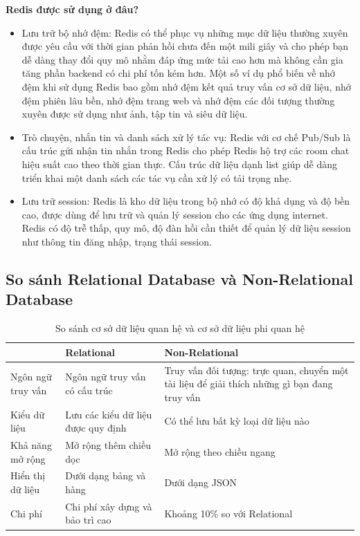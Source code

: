 \textbf{Redis được sử dụng ở đâu?}
\begin{itemize}
    \item Lưu trữ bộ nhớ đệm: Redis có thể phục vụ những mục dữ liệu thường xuyên được yêu cầu với thời gian phản hồi chưa đến một mili giây và cho phép bạn dễ dàng thay đổi quy mô nhằm đáp ứng mức tải cao hơn mà không cần gia tăng phần backend có chi phí tốn kém hơn. Một số ví dụ phổ biến về nhớ đệm khi sử dụng Redis bao gồm nhớ đệm kết quả truy vấn cơ sở dữ liệu, nhớ đệm phiên lâu bền, nhớ đệm trang web và nhớ đệm các đối tượng thường xuyên được sử dụng như ảnh, tập tin và siêu dữ liệu.
    \item Trò chuyện, nhắn tin và danh sách xử lý tác vụ: Redis với cơ chế Pub/Sub là cấu trúc gửi nhận tin nhắn trong Redis cho phép Redis hộ trợ các room chat hiệu suất cao theo thời gian thực. Cấu trúc dữ liệu dạnh list giúp dễ dàng triển khai một danh sách các tác vụ cần xử lý có tải trọng nhẹ.
    \item Lưu trữ session: Redis là kho dữ liệu trong bộ nhớ có độ khả dụng và độ bền cao, được dùng để lưu trữ và quản lý session cho các ứng dụng internet. Redis có độ trễ thấp, quy mô, độ đàn hồi cần thiết để quản lý dữ liệu session như thông tin đăng nhập, trạng thái session.
\end{itemize}
\subsection{So sánh Relational Database và Non-Relational Database}
\begin{table}[H]
	    \centering
	    \begin{tabular}{|p{3cm}|p{6cm}|p{6cm}|}
	        \hline
	        &\textbf{Relational}&\textbf{Non-Relational}\\
	        \hline
	        Ngôn ngữ truy vấn&Ngôn ngữ truy vấn có cấu trúc &Truy vấn đối tượng: trực quan, chuyển một tài liệu để giải thích những gì bạn đang truy vấn\\
	        \hline
	        Kiểu dữ liệu&Lưu các kiểu dữ liệu được quy định&Có thể lưu bất kỳ loại dữ liệu nào\\
	        \hline
	        Khả năng mở rộng&Mở rộng thêm chiều dọc&Mở rộng theo chiều ngang\\
	        \hline
	        Hiển thị dữ liệu&Dưới dạng bảng và hàng&Dưới dạng JSON\\
	        \hline
	        Chi phí&Chi phí xây dựng và bảo trì cao&Khoảng 10\% so với Relational\\
	        \hline
	    \end{tabular}
	    \caption{So sánh cơ sở dữ liệu quan hệ và cơ sở dữ liệu phi quan hệ}
	\end{table}
